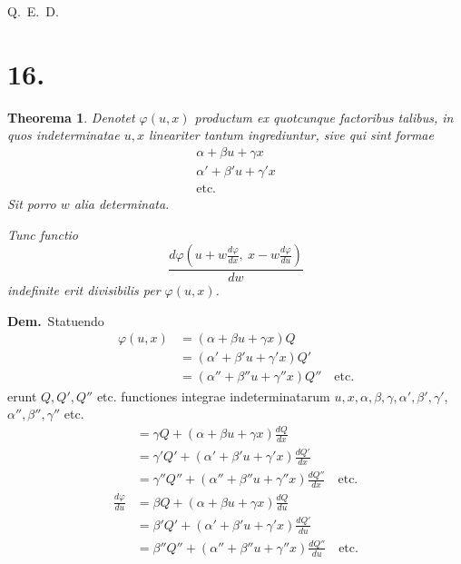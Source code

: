 \documentclass[12pt,a4paper]{article}
\theoremstyle{plain}
\newtheorem{theorema}{Theorema}[section]
\begin{document}
\hfill Q.\ E.\ D.

\section*{16.}

\begin{theorema}
Denotet $\varphi(u, x)$ productum ex quotcunque factoribus talibus, in
quos indeterminatae $u, x$ lineariter tantum ingrediuntur, sive qui sint formae
\begin{gather*}
\alpha + \beta u + \gamma x \\
\alpha' + \beta' u + \gamma' x \\
\text{etc.}
\end{gather*}
Sit porro $w$ alia determinata.

Tunc functio
\[
\frac{d\varphi(u+w\frac{d\varphi}{dx},\ x-w\frac{d\varphi}{du})}{dw}
\]
indefinite erit divisibilis per $\varphi(u, x)$.
\end{theorema}

\textbf{Dem.}\ Statuendo
\begin{align*}
\varphi(u,x) &= (\alpha + \beta u + \gamma x) Q \\
&= (\alpha' + \beta' u + \gamma' x) Q' \\
&= (\alpha'' + \beta'' u + \gamma'' x) Q'' \quad \text{etc.}
\end{align*}
erunt $Q, Q', Q''$ etc.
functiones integrae indeterminatarum $u, x, \alpha, \beta, \gamma, \alpha', \beta', \gamma'$,
$\alpha'', \beta'', \gamma''$ etc.
\begin{align*}
&= \gamma Q + (\alpha + \beta u + \gamma x) \frac{dQ}{dx} \\
&= \gamma' Q' + (\alpha' + \beta' u + \gamma' x) \frac{dQ'}{dx} \\
&= \gamma'' Q'' + (\alpha'' + \beta'' u + \gamma'' x) \frac{dQ''}{dx} \quad \text{etc.} \\
\frac{d\varphi}{du} &= \beta Q + (\alpha + \beta u + \gamma x) \frac{dQ}{du} \\
&= \beta' Q' + (\alpha' + \beta' u + \gamma' x) \frac{dQ'}{du} \\
&= \beta'' Q'' + (\alpha'' + \beta'' u + \gamma'' x) \frac{dQ''}{du} \quad \text{etc.}
\end{align*}
\end{document}
